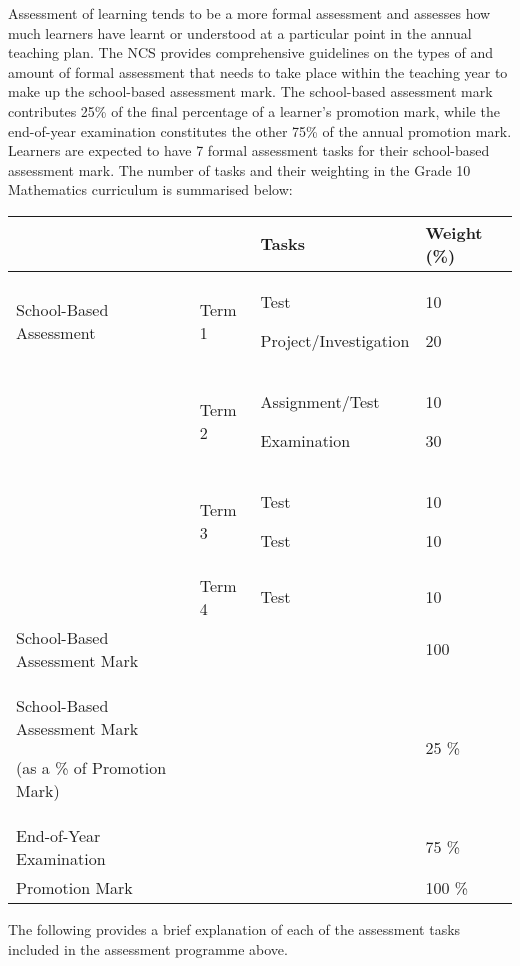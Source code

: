 Assessment of learning tends to be a more formal assessment and assesses how much learners have learnt or understood at a particular point in the annual teaching plan. The NCS provides comprehensive guidelines on the types of and amount of formal assessment that needs to take place within the teaching year to make up the school-based assessment mark. The school-based assessment mark contributes 25\% of the final percentage of a learner’s promotion mark, while the end-of-year examination constitutes the other 75\% of the annual promotion mark. Learners are expected to have 7 formal assessment tasks for their school-based assessment mark. The number of tasks and their weighting in the Grade 10 Mathematics curriculum is summarised below: 
\begin{table}[H]
\begin{center}
\begin{tabular} {|p{4.5cm}|p{1.5cm}|p{3cm}|p{2cm}|} \hline
	  & 			& \textbf{Tasks} 			& \textbf{Weight (\%)} \\ \hline
School-Based Assessment & Term 1 & Test \par Project/Investigation 	& 10 \par 20 \\ \hline
			& Term 2 & Assignment/Test \par Examination 	& 10 \par 30 \\ \hline
			& Term 3 & Test \par Test 			& 10 \par 10 \\ \hline
			& Term 4 & Test 				&  10 \\ \hline
School-Based Assessment Mark&    & 					& 100 \\ \hline
School-Based Assessment Mark  \par
(as a \% of Promotion Mark)
			&	 & 					&  25 \% \\ \hline

End-of-Year Examination & 	& 					&75 \% \\ \hline
Promotion Mark 		&       & 					& 100 \% \\ \hline


\end{tabular}
 \end{center}
\end{table}

The following provides a brief explanation of each of the assessment tasks included in the assessment programme above. 
